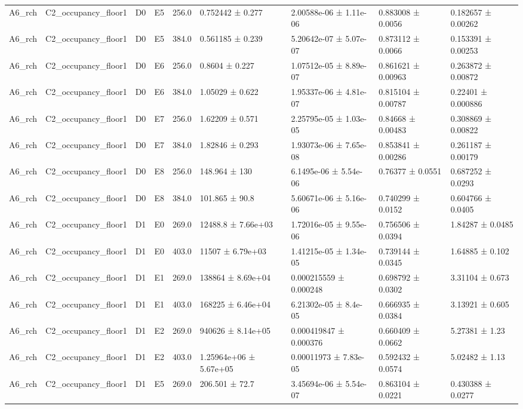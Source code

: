 \begin{table}
\begin{tabular}{lllllllll}
A6\_rch & C2\_occupancy\_floor1 & D0 & E5 & 256.0 & 0.752442 ± 0.277 & 2.00588e-06 ± 1.11e-06 & 0.883008 ± 0.0056 & 0.182657 ± 0.00262 \\
A6\_rch & C2\_occupancy\_floor1 & D0 & E5 & 384.0 & 0.561185 ± 0.239 & 5.20642e-07 ± 5.07e-07 & 0.873112 ± 0.0066 & 0.153391 ± 0.00253 \\
A6\_rch & C2\_occupancy\_floor1 & D0 & E6 & 256.0 & 0.8604 ± 0.227 & 1.07512e-05 ± 8.89e-07 & 0.861621 ± 0.00963 & 0.263872 ± 0.00872 \\
A6\_rch & C2\_occupancy\_floor1 & D0 & E6 & 384.0 & 1.05029 ± 0.622 & 1.95337e-06 ± 4.81e-07 & 0.815104 ± 0.00787 & 0.22401 ± 0.000886 \\
A6\_rch & C2\_occupancy\_floor1 & D0 & E7 & 256.0 & 1.62209 ± 0.571 & 2.25795e-05 ± 1.03e-05 & 0.84668 ± 0.00483 & 0.308869 ± 0.00822 \\
A6\_rch & C2\_occupancy\_floor1 & D0 & E7 & 384.0 & 1.82846 ± 0.293 & 1.93073e-06 ± 7.65e-08 & 0.853841 ± 0.00286 & 0.261187 ± 0.00179 \\
A6\_rch & C2\_occupancy\_floor1 & D0 & E8 & 256.0 & 148.964 ± 130 & 6.1495e-06 ± 5.54e-06 & 0.76377 ± 0.0551 & 0.687252 ± 0.0293 \\
A6\_rch & C2\_occupancy\_floor1 & D0 & E8 & 384.0 & 101.865 ± 90.8 & 5.60671e-06 ± 5.16e-06 & 0.740299 ± 0.0152 & 0.604766 ± 0.0405 \\
A6\_rch & C2\_occupancy\_floor1 & D1 & E0 & 269.0 & 12488.8 ± 7.66e+03 & 1.72016e-05 ± 9.55e-06 & 0.756506 ± 0.0394 & 1.84287 ± 0.0485 \\
A6\_rch & C2\_occupancy\_floor1 & D1 & E0 & 403.0 & 11507 ± 6.79e+03 & 1.41215e-05 ± 1.34e-05 & 0.739144 ± 0.0345 & 1.64885 ± 0.102 \\
A6\_rch & C2\_occupancy\_floor1 & D1 & E1 & 269.0 & 138864 ± 8.69e+04 & 0.000215559 ± 0.000248 & 0.698792 ± 0.0302 & 3.31104 ± 0.673 \\
A6\_rch & C2\_occupancy\_floor1 & D1 & E1 & 403.0 & 168225 ± 6.46e+04 & 6.21302e-05 ± 8.4e-05 & 0.666935 ± 0.0384 & 3.13921 ± 0.605 \\
A6\_rch & C2\_occupancy\_floor1 & D1 & E2 & 269.0 & 940626 ± 8.14e+05 & 0.000419847 ± 0.000376 & 0.660409 ± 0.0662 & 5.27381 ± 1.23 \\
A6\_rch & C2\_occupancy\_floor1 & D1 & E2 & 403.0 & 1.25964e+06 ± 5.67e+05 & 0.00011973 ± 7.83e-05 & 0.592432 ± 0.0574 & 5.02482 ± 1.13 \\
A6\_rch & C2\_occupancy\_floor1 & D1 & E5 & 269.0 & 206.501 ± 72.7 & 3.45694e-06 ± 5.54e-07 & 0.863104 ± 0.0221 & 0.430388 ± 0.0277 \\

\end{tabular}
\end{table}
